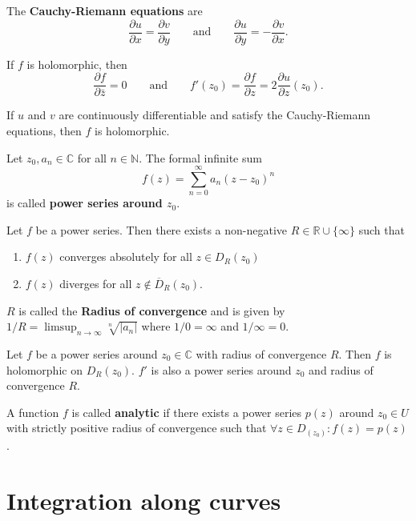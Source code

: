 \begin{definition}
  The \textbf{Cauchy-Riemann equations} are
  \[
  \frac{\partial u}{\partial x} = \frac{\partial v}{\partial y}
  \qquad\text{and}\qquad
  \frac{\partial u}{\partial y} = -\frac{\partial v}{\partial x}.
  \]
\end{definition}

\begin{proposition}
  If $f$ is holomorphic, then
  \[
  \frac{\partial f}{\partial \bar z} = 0
  \qquad\text{and}\qquad
  f'(z_0) = \frac{\partial f}{\partial z} = 2\frac{\partial u}{\partial z} (z_0).
  \]
\end{proposition}

\begin{theorem}
  If $u$ and $v$ are continuously differentiable and satisfy the Cauchy-Riemann equations,
  then $f$ is holomorphic.
\end{theorem}

\begin{definition}
  Let $z_0, a_n \in \mathbb C$ for all $n\in\mathbb N$.
  The formal infinite sum
  \[
  f(z) = \sum_{n=0}^\infty a_n (z - z_0)^n
  \]
  is called \textbf{power series around $z_0$}.
\end{definition}

\begin{theorem}
  Let $f$ be a power series.
  Then there exists a non-negative $R \in \mathbb R \cup \{\infty\}$ such that
  \begin{enumerate}
    \item $f(z)$ converges absolutely for all $z \in D_R(z_0)$
    \item $f(z)$ diverges for all $z \notin \overline D_R(z_0)$.
  \end{enumerate}
  $R$ is called the \textbf{Radius of convergence} and is given by
  $1/R = \limsup_{n \to \infty} \sqrt[n]{|a_n|}$
  where $1/0 = \infty$ and $1/\infty = 0$.
\end{theorem}

\begin{theorem}
  Let $f$ be a power series around $z_0 \in \mathbb C$ with radius of convergence $R$.
  Then $f$ is holomorphic on $D_R(z_0)$.
  $f'$ is also a power series around $z_0$ and radius of convergence $R$.
\end{theorem}

\begin{definition}
  A function $f$ is called \textbf{analytic}
  if there exists a power series $p(z)$ around $z_0 \in U$ with strictly positive radius of convergence
  such that $\forall z \in D_(z_0)\colon f(z) = p(z)$.
\end{definition}

\section{Integration along curves}



